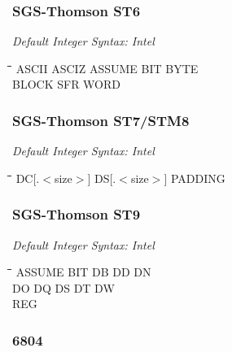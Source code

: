 \subsubsection{SGS-Thomson ST6}

{\em Default Integer Syntax: Intel}

{\tt\begin{tabbing}
\hspace{3cm}\=\hspace{3cm}\=\hspace{3cm}\=\hspace{3cm}\=\kill
ASCII      \> ASCIZ       \> ASSUME      \> BIT  \>  BYTE \\
BLOCK      \> SFR         \> WORD \\
\end{tabbing}}

\subsubsection{SGS-Thomson ST7/STM8}

{\em Default Integer Syntax: Intel}

{\tt\begin{tabbing}
\hspace{3cm}\=\hspace{3cm}\=\hspace{3cm}\=\hspace{3cm}\=\kill
DC[.$<$size$>$] \> DS[.$<$size$>$]   \> PADDING \\
\end{tabbing}}

\subsubsection{SGS-Thomson ST9}

{\em Default Integer Syntax: Intel}

{\tt\begin{tabbing}
\hspace{3cm}\=\hspace{3cm}\=\hspace{3cm}\=\hspace{3cm}\=\kill
ASSUME     \> BIT         \> DB          \> DD          \> DN \\
DO         \> DQ          \> DS          \> DT          \> DW \\
REG \\
\end{tabbing}}

\subsubsection{6804}

